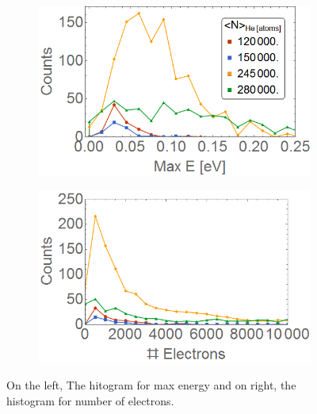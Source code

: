 \documentclass[a4paper,12pt,bibtotocnumbered, twosite]{scrreprt}
\begin{document}
\begin{figure}[h!]
\centering
\begin{subfigure}[l]{0.49\textwidth}
\includegraphics[width=1\textwidth]{../Images/results/Mir_He_Dropletsize/Henerg.png}   				\end{subfigure}
\begin{subfigure}[l]{0.49\textwidth}
\includegraphics[width =1\textwidth]{../Images/results/Mir_He_Dropletsize/Helec.png} 
\end{subfigure}
\caption[MIR He droplet scan histograms]{On the left, The hitogram for max energy and on right, the histogram for number of electrons.}
\label{fig:histodropletsize}
\end{figure}


\end{document}
